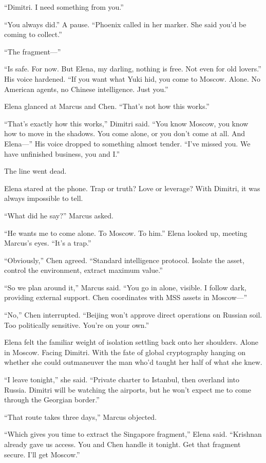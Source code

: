 ``Dimitri. I need something from you.''

``You always did.'' A pause. ``Phoenix called in her marker. She said you'd be coming to collect.''

``The fragment---''

``Is safe. For now. But Elena, my darling, nothing is free. Not even for old lovers.'' His voice hardened. ``If you want what Yuki hid, you come to Moscow. Alone. No American agents, no Chinese intelligence. Just you.''

Elena glanced at Marcus and Chen. ``That's not how this works.''

``That's exactly how this works,'' Dimitri said. ``You know Moscow, you know how to move in the shadows. You come alone, or you don't come at all. And Elena---'' His voice dropped to something almost tender. ``I've missed you. We have unfinished business, you and I.''

The line went dead.

Elena stared at the phone. Trap or truth? Love or leverage? With Dimitri, it was always impossible to tell.

``What did he say?'' Marcus asked.

``He wants me to come alone. To Moscow. To him.'' Elena looked up, meeting Marcus's eyes. ``It's a trap.''

``Obviously,'' Chen agreed. ``Standard intelligence protocol. Isolate the asset, control the environment, extract maximum value.''

``So we plan around it,'' Marcus said. ``You go in alone, visible. I follow dark, providing external support. Chen coordinates with MSS assets in Moscow---''

``No,'' Chen interrupted. ``Beijing won't approve direct operations on Russian soil. Too politically sensitive. You're on your own.''

Elena felt the familiar weight of isolation settling back onto her shoulders. Alone in Moscow. Facing Dimitri. With the fate of global cryptography hanging on whether she could outmaneuver the man who'd taught her half of what she knew.

``I leave tonight,'' she said. ``Private charter to Istanbul, then overland into Russia. Dimitri will be watching the airports, but he won't expect me to come through the Georgian border.''

``That route takes three days,'' Marcus objected.

``Which gives you time to extract the Singapore fragment,'' Elena said. ``Krishnan already gave us access. You and Chen handle it tonight. Get that fragment secure. I'll get Moscow.''

